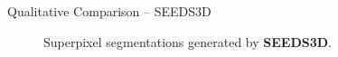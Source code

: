 \documentclass[handout]{beamer}
\begin{document}
	\begin{frame}{Qualitative Comparison -- SEEDS3D}
		\begin{figure}
   			\centering
   			\caption{Superpixel segmentations generated by \textbf{SEEDS3D}.}
   		\end{figure}
	\end{frame}
	
\end{document}
